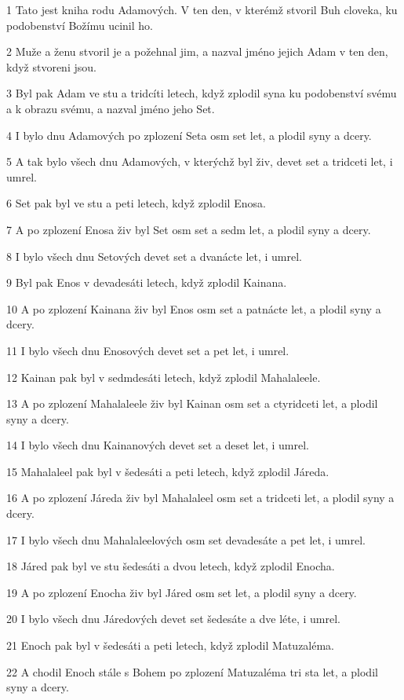 \par 1 Tato jest kniha rodu Adamových. V ten den, v kterémž stvoril Buh cloveka, ku podobenství Božímu ucinil ho.
\par 2 Muže a ženu stvoril je a požehnal jim, a nazval jméno jejich Adam v ten den, když stvoreni jsou.
\par 3 Byl pak Adam ve stu a tridcíti letech, když zplodil syna ku podobenství svému a k obrazu svému, a nazval jméno jeho Set.
\par 4 I bylo dnu Adamových po zplození Seta osm set let, a plodil syny a dcery.
\par 5 A tak bylo všech dnu Adamových, v kterýchž byl živ, devet set a tridceti let, i umrel.
\par 6 Set pak byl ve stu a peti letech, když zplodil Enosa.
\par 7 A po zplození Enosa živ byl Set osm set a sedm let, a plodil syny a dcery.
\par 8 I bylo všech dnu Setových devet set a dvanácte let, i umrel.
\par 9 Byl pak Enos v devadesáti letech, když zplodil Kainana.
\par 10 A po zplození Kainana živ byl Enos osm set a patnácte let, a plodil syny a dcery.
\par 11 I bylo všech dnu Enosových devet set a pet let, i umrel.
\par 12 Kainan pak byl v sedmdesáti letech, když zplodil Mahalaleele.
\par 13 A po zplození Mahalaleele živ byl Kainan osm set a ctyridceti let, a plodil syny a dcery.
\par 14 I bylo všech dnu Kainanových devet set a deset let, i umrel.
\par 15 Mahalaleel pak byl v šedesáti a peti letech, když zplodil Járeda.
\par 16 A po zplození Járeda živ byl Mahalaleel osm set a tridceti let, a plodil syny a dcery.
\par 17 I bylo všech dnu Mahalaleelových osm set devadesáte a pet let, i umrel.
\par 18 Járed pak byl ve stu šedesáti a dvou letech, když zplodil Enocha.
\par 19 A po zplození Enocha živ byl Járed osm set let, a plodil syny a dcery.
\par 20 I bylo všech dnu Járedových devet set šedesáte a dve léte, i umrel.
\par 21 Enoch pak byl v šedesáti a peti letech, když zplodil Matuzaléma.
\par 22 A chodil Enoch stále s Bohem po zplození Matuzaléma tri sta let, a plodil syny a dcery.
